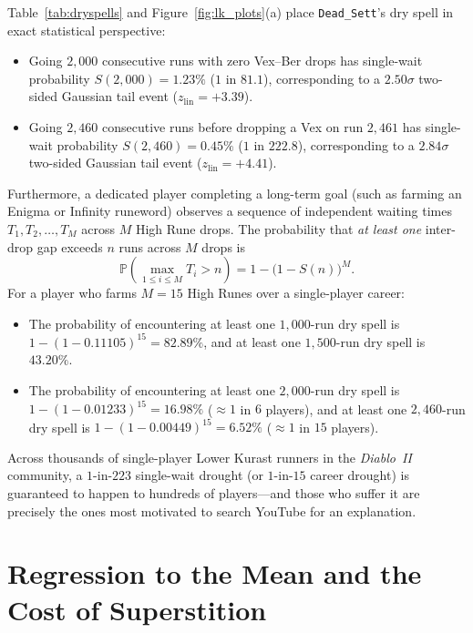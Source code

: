 \documentclass[11pt,reqno]{amsart}
\theoremstyle{definition}
\begin{document}
Table~\ref{tab:dryspells} and Figure~\ref{fig:lk_plots}(a) place \texttt{Dead\_Sett}'s dry spell in exact statistical perspective:
\begin{itemize}
    \item Going $2{,}000$ consecutive runs with zero Vex--Ber drops has single-wait probability $S(2{,}000) = 1.23\%$ ($1$ in $81.1$), corresponding to a $2.50\sigma$ two-sided Gaussian tail event ($z_{\text{lin}} = +3.39$).
    \item Going $2{,}460$ consecutive runs before dropping a Vex on run $2{,}461$ has single-wait probability $S(2{,}460) = 0.45\%$ ($1$ in $222.8$), corresponding to a $2.84\sigma$ two-sided Gaussian tail event ($z_{\text{lin}} = +4.41$).
\end{itemize}
Furthermore, a dedicated player completing a long-term goal (such as farming an Enigma or Infinity runeword) observes a sequence of independent waiting times $T_1, T_2, \dots, T_M$ across $M$ High Rune drops. The probability that \emph{at least one} inter-drop gap exceeds $n$ runs across $M$ drops is
\begin{equation}
    \mathbb{P}\!\left(\max_{1 \le i \le M} T_i > n\right) = 1 - \big(1 - S(n)\big)^M.
\end{equation}
For a player who farms $M = 15$ High Runes over a single-player career:
\begin{itemize}
    \item The probability of encountering at least one $1{,}000$-run dry spell is $1 - (1 - 0.11105)^{15} = \mathbf{82.89\%}$, and at least one $1{,}500$-run dry spell is $\mathbf{43.20\%}$.
    \item The probability of encountering at least one $2{,}000$-run dry spell is $1 - (1 - 0.01233)^{15} = \mathbf{16.98\%}$ ($\approx 1$ in $6$ players), and at least one $2{,}460$-run dry spell is $1 - (1 - 0.00449)^{15} = \mathbf{6.52\%}$ ($\approx 1$ in $15$ players).
\end{itemize}
Across thousands of single-player Lower Kurast runners in the \emph{Diablo~II} community, a $1$-in-$223$ single-wait drought (or $1$-in-$15$ career drought) is guaranteed to happen to hundreds of players—and those who suffer it are precisely the ones most motivated to search YouTube for an explanation.

\section{Regression to the Mean and the Cost of Superstition}
\label{sec:reversion}
\end{document}
